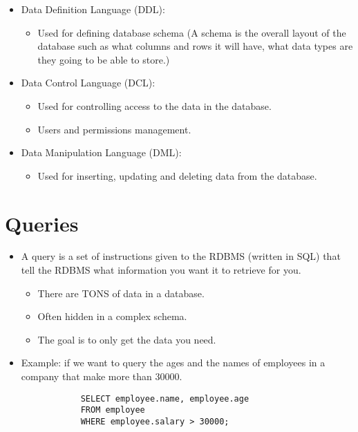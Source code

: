 \begin{itemize}
\begin{itemize}
            \item Data Definition Language (DDL):
                \begin{itemize}
                    \item Used for defining database schema (A schema is the overall layout of the database such as what columns and rows it will have, what data types are they going to be able to store.)
                \end{itemize}
            
            \item Data Control Language (DCL):
                \begin{itemize}
                    \item Used for controlling access to the data in the database.
                    \item Users and permissions management.
                \end{itemize}
            
            \item Data Manipulation Language (DML):
                \begin{itemize}
                    \item Used for inserting, updating and deleting data from the database.
                \end{itemize}
        \end{itemize}
\end{itemize}

\section{Queries}
\begin{itemize}
    \item A query is a set of instructions given to the RDBMS (written in SQL) that tell the RDBMS what information you want it to retrieve for you.
        \begin{itemize}
            \item There are TONS of data in a database.
            \item Often hidden in a complex schema.
            \item The goal is to only get the data you need.
        \end{itemize}
    
    \item Example: if we want to query the ages and the names of employees in a company that make more than 30000.
        \begin{verbatim}
            SELECT employee.name, employee.age
            FROM employee 
            WHERE employee.salary > 30000;
        \end{verbatim}
\end{itemize}
